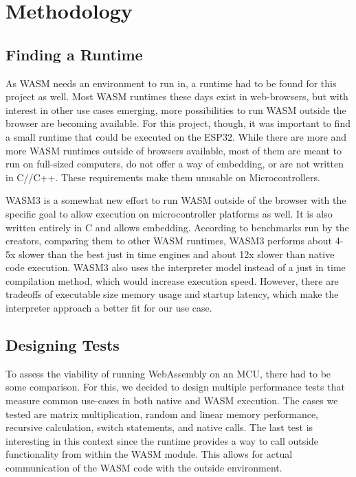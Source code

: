
\chapter{Methodology}\label{chapter:methodology}
\section{Finding a Runtime}
As WASM needs an environment to run in, a runtime had to be found for this project as well. Most WASM runtimes these days exist in web-browsers, but with interest in other use cases emerging, more possibilities to run WASM outside the browser are becoming available. For this project, though, it was important to find a small runtime that could be executed on the ESP32.
While there are more and more WASM runtimes outside of browsers available, most of them are meant to run on full-sized computers, do not offer a way of embedding, or are not written in C//C++. These requirements make them unusable on Microcontrollers.

WASM3 is a somewhat new effort to run WASM outside of the browser with the specific goal to allow execution on microcontroller platforms as well. It is also written entirely in C and allows embedding. According to benchmarks run by the creators, comparing them to other WASM runtimes, WASM3 performs about 4-5x slower than the best just in time engines and about 12x slower than native code execution.
WASM3 also uses the interpreter model instead of a just in time compilation method, which would increase execution speed. However, there are tradeoffs of executable size memory usage and startup latency, which make the interpreter approach a better fit for our use case.
\section{Designing Tests}
To assess the viability of running WebAssembly on an MCU, there had to be some comparison. For this, we decided to design multiple performance tests that measure common use-cases in both native and WASM execution.
The cases we tested are matrix multiplication, random and linear memory performance, recursive calculation, switch statements, and native calls. The last test is interesting in this context since the runtime provides a way to call outside functionality from within the WASM module. This allows for actual communication of the WASM code with the outside environment.
